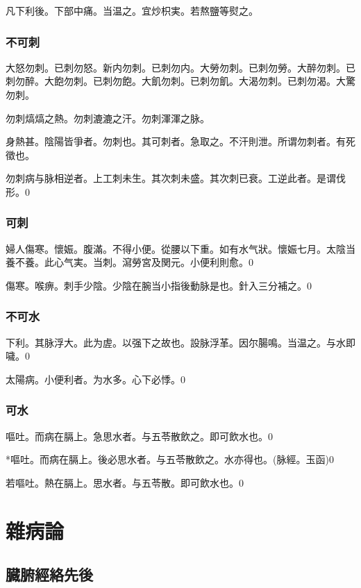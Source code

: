 凡下利後。下部中痛。当温之。宜炒枳実。若熬鹽等熨之。{\gaoben}

\section{不可刺}

大怒勿刺。{\khaaitp 已刺勿怒。}新内勿刺。{\khaaitp 已刺勿内。}大勞勿刺。{\khaaitp 已刺勿勞。}大醉勿刺。{\khaaitp 已刺勿醉。}大飽勿刺。{\khaaitp 已刺勿飽。大飢勿刺。已刺勿飢。}大渴勿刺。{\khaaitp 已刺勿渴。}大驚勿刺。

勿刺熇熇之熱。勿刺漉漉之汗。勿刺渾渾之脉。

身熱甚。陰陽皆爭者。勿刺也。其可刺者。急取之。不汗則泄。所谓勿刺者。有死徵也。

勿刺病与脉相逆者。上工刺未生。其次刺未盛。其次刺已衰。工逆此者。是谓伐形。0

\section{可刺}

婦人傷寒。懷娠。腹滿。不得小便。從腰以下重。如有水气狀。懷娠七月。太陰当養不養。此心气実。当刺。瀉勞宮及関元。小便利則愈。0

傷寒。喉痹。刺手少陰。少陰在腕当小指後動脉是也。針入三分補之。0

\section{不可水}

下利。其脉浮大。此为虗。以强下之故也。設脉浮革。因尔腸鳴。当温之。与水即噦。0

太陽病。小便利者。为水多。心下必悸。0

\section{可水}

嘔吐。而病在膈上。急思水者。与五苓散飲之。即可飲水也。0

*嘔吐。而病在膈上。後必思水者。与五苓散飲之。水亦得也。(脉經。玉函)0

若嘔吐。熱在膈上。思水者。与五苓散。即可飲水也。{\gaoben}0

\part{雜病論}

\chapter{臓腑經絡先後}

